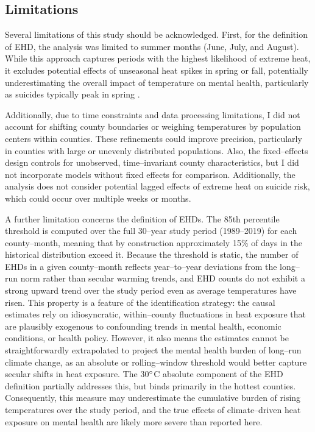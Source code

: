 \documentclass[12pt, a4paper]{article}
\begin{document}
\subsection{Limitations}

Several limitations of this study should be acknowledged. First, for the definition of EHD, the analysis was limited to summer months (June, July, and August). While this approach captures periods with the highest likelihood of extreme heat, it excludes potential effects of unseasonal heat spikes in spring or fall, potentially underestimating the overall impact of temperature on mental health, particularly as suicides typically peak in spring \cite{bridges2005}.

Additionally, due to time constraints and data processing limitations, I did not account for shifting county boundaries or weighing temperatures by population centers within counties. These refinements could improve precision, particularly in counties with large or unevenly distributed populations. Also, the fixed--effects design controls for unobserved, time--invariant county characteristics, but I did not incorporate models without fixed effects for comparison. Additionally, the analysis does not consider potential lagged effects of extreme heat on suicide risk, which could occur over multiple weeks or months.

A further limitation concerns the definition of EHDs. The 85th percentile threshold is computed over the full 30--year study period (1989--2019) for each county--month, meaning that by construction approximately 15\% of days in the historical distribution exceed it. Because the threshold is static, the number of EHDs in a given county--month reflects year--to--year deviations from the long--run norm rather than secular warming trends, and EHD counts do not exhibit a strong upward trend over the study period even as average temperatures have risen. This property is a feature of the identification strategy: the causal estimates rely on idiosyncratic, within--county fluctuations in heat exposure that are plausibly exogenous to confounding trends in mental health, economic conditions, or health policy. However, it also means the estimates cannot be straightforwardly extrapolated to project the mental health burden of long--run climate change, as an absolute or rolling--window threshold would better capture secular shifts in heat exposure. The 30$\degree$C absolute component of the EHD definition partially addresses this, but binds primarily in the hottest counties. Consequently, this measure may underestimate the cumulative burden of rising temperatures over the study period, and the true effects of climate--driven heat exposure on mental health are likely more severe than reported here.
\end{document}
